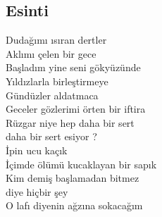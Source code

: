 \subsection{Esinti}

Dudağımı ısıran dertler \\
Aklımı çelen bir gece \\
Başladım yine seni gökyüzünde \\
Yıldızlarla birleştirmeye \\

\noindent\newline
Gündüzler aldatmaca \\
Geceler gözlerimi örten bir iftira \\
Rüzgar niye hep daha bir sert \\
daha bir sert esiyor ? \\

\noindent\newline
İpin ucu kaçık \\
İçimde ölümü kucaklayan bir sapık \\
Kim demiş başlamadan bitmez \\
diye hiçbir şey \\
O lafı diyenin ağzına sokacağım \\